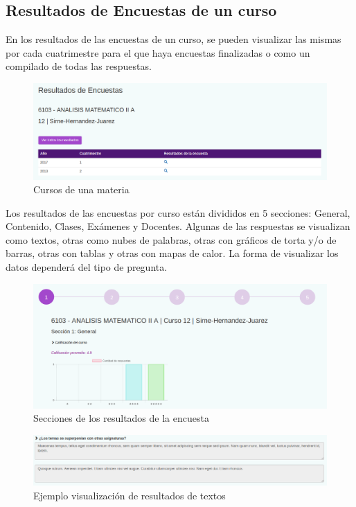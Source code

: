 \documentclass[a4paper]{article}
\begin{document}
\subsection{Resultados de Encuestas de un curso}

En los resultados de las encuestas de un curso, se pueden visualizar las mismas por cada cuatrimestre para el que haya encuestas finalizadas o como un compilado de todas las respuestas.

\begin{figure}[H]
\centering
\includegraphics[scale=0.35]{Imagenes/listado_resultados_encuesta_curso.png}\par
\caption{Cursos de una materia}
\end{figure}

Los resultados de las encuestas por curso están divididos en 5 secciones: General, Contenido, Clases, Exámenes y Docentes. Algunas de las respuestas se visualizan como textos, otras como nubes de palabras, otras con gráficos de torta y/o de barras, otras con tablas y otras con mapas de calor. La forma de visualizar los datos dependerá del tipo de pregunta.

\begin{figure}[H]
\centering
\includegraphics[scale=0.3]{Imagenes/secciones_resultados_encuesta.png}\par
\caption{Secciones de los resultados de la encuesta}
\end{figure}

\begin{figure}[H]
\centering
\includegraphics[scale=0.35]{Imagenes/resultados_texto.png}\par
\caption{Ejemplo visualización de resultados de textos}
\end{figure}
\end{document}
